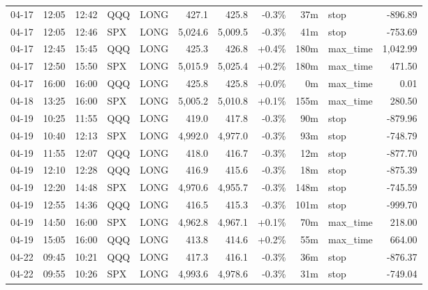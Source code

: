 \documentclass[11pt,a4paper,twoside]{article}
\begin{document}
\begin{center}
\begin{longtable}{>{\color{txtmain}}l l l l l r r r r >{\color{txtmain}}l r}
04-17 & 12:05 & 12:42 & QQQ & LONG & 427.1 & 425.8 & \textcolor{lossred}{-0.3\%} & 37m & stop & \textcolor{lossred}{-896.89} \\
04-17 & 12:05 & 12:46 & SPX & LONG & 5,024.6 & 5,009.5 & \textcolor{lossred}{-0.3\%} & 41m & stop & \textcolor{lossred}{-753.69} \\
04-17 & 12:45 & 15:45 & QQQ & LONG & 425.3 & 426.8 & \textcolor{wingreen}{+0.4\%} & 180m & max\_time & \textcolor{wingreen}{1,042.99} \\
04-17 & 12:50 & 15:50 & SPX & LONG & 5,015.9 & 5,025.4 & \textcolor{wingreen}{+0.2\%} & 180m & max\_time & \textcolor{wingreen}{471.50} \\
04-17 & 16:00 & 16:00 & QQQ & LONG & 425.8 & 425.8 & \textcolor{wingreen}{+0.0\%} & 0m & max\_time & \textcolor{wingreen}{0.01} \\
04-18 & 13:25 & 16:00 & SPX & LONG & 5,005.2 & 5,010.8 & \textcolor{wingreen}{+0.1\%} & 155m & max\_time & \textcolor{wingreen}{280.50} \\
04-19 & 10:25 & 11:55 & QQQ & LONG & 419.0 & 417.8 & \textcolor{lossred}{-0.3\%} & 90m & stop & \textcolor{lossred}{-879.96} \\
04-19 & 10:40 & 12:13 & SPX & LONG & 4,992.0 & 4,977.0 & \textcolor{lossred}{-0.3\%} & 93m & stop & \textcolor{lossred}{-748.79} \\
04-19 & 11:55 & 12:07 & QQQ & LONG & 418.0 & 416.7 & \textcolor{lossred}{-0.3\%} & 12m & stop & \textcolor{lossred}{-877.70} \\
04-19 & 12:10 & 12:28 & QQQ & LONG & 416.9 & 415.6 & \textcolor{lossred}{-0.3\%} & 18m & stop & \textcolor{lossred}{-875.39} \\
04-19 & 12:20 & 14:48 & SPX & LONG & 4,970.6 & 4,955.7 & \textcolor{lossred}{-0.3\%} & 148m & stop & \textcolor{lossred}{-745.59} \\
04-19 & 12:55 & 14:36 & QQQ & LONG & 416.5 & 415.3 & \textcolor{lossred}{-0.3\%} & 101m & stop & \textcolor{lossred}{-999.70} \\
04-19 & 14:50 & 16:00 & SPX & LONG & 4,962.8 & 4,967.1 & \textcolor{wingreen}{+0.1\%} & 70m & max\_time & \textcolor{wingreen}{218.00} \\
04-19 & 15:05 & 16:00 & QQQ & LONG & 413.8 & 414.6 & \textcolor{wingreen}{+0.2\%} & 55m & max\_time & \textcolor{wingreen}{664.00} \\
04-22 & 09:45 & 10:21 & QQQ & LONG & 417.3 & 416.1 & \textcolor{lossred}{-0.3\%} & 36m & stop & \textcolor{lossred}{-876.37} \\
04-22 & 09:55 & 10:26 & SPX & LONG & 4,993.6 & 4,978.6 & \textcolor{lossred}{-0.3\%} & 31m & stop & \textcolor{lossred}{-749.04} \\

\end{longtable}
\end{center}
\end{document}
